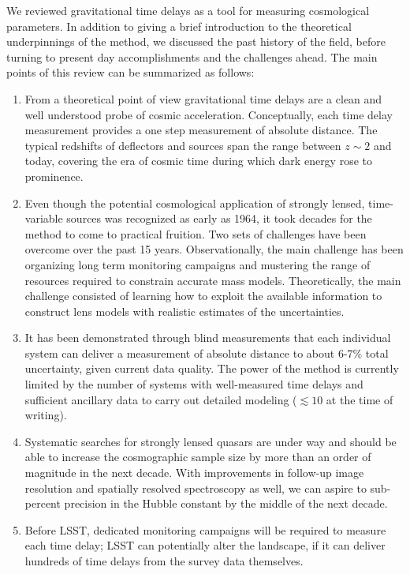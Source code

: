 We reviewed gravitational time delays as a tool for measuring
cosmological parameters. In addition to giving a brief introduction to
the theoretical underpinnings of the method, we discussed the past
history of the field, before turning to present day accomplishments
and the challenges ahead. The main points of this review can be
summarized as follows:

\begin{enumerate}
\item From a theoretical point of view gravitational time delays are a
clean and well understood probe of cosmic acceleration. Conceptually,
each time delay measurement provides a one step measurement of
absolute distance. The typical redshifts of deflectors and sources
span the range between $z\sim2$ and today, covering the era of cosmic
time during which dark energy rose to prominence.
%
\item Even though the potential cosmological application of strongly
lensed, time-variable sources was recognized as early as 1964, it took
decades for the method to come to practical fruition. Two sets of
challenges have been overcome over the past 15 years. Observationally, the
main challenge has been organizing long term monitoring campaigns and
mustering the range of resources required to constrain accurate mass
models. Theoretically, the main challenge consisted of learning how to
exploit the available information to construct lens models with
realistic estimates of the uncertainties.
%
\item It has been demonstrated through blind measurements that each
individual system can deliver a measurement of absolute distance to
about 6-7\% total uncertainty, given current data quality.   The power of
the method is currently limited by the number of systems with
well-measured time delays and sufficient ancillary data to carry out
detailed modeling ($\lesssim10$ at the time of writing).
%
\item Systematic searches for strongly lensed quasars are under way and
should be able to increase the cosmographic sample size by more than
an order of magnitude in the next decade. With improvements in
follow-up image resolution and spatially resolved spectroscopy as
well, we can aspire to sub-percent precision in the Hubble constant by
the middle of the next decade.
%
\item Before LSST, dedicated monitoring campaigns will be required to
measure each time delay; LSST can potentially alter the landscape, if
it can deliver hundreds of time delays from the survey data themselves.

\end{enumerate}
